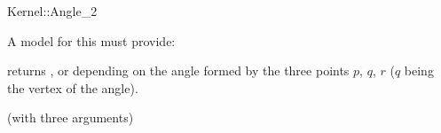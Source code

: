 \begin{ccRefFunctionObjectConcept}{Kernel::Angle_2}


A model for this must provide:


{returns ,  or  depending
on the angle formed by the three points $p$, $q$, $r$ ($q$ being the vertex of
the angle).}

\ccRefines
{} (with three arguments)

\ccSeeAlso
{}  \\

\end{ccRefFunctionObjectConcept}
